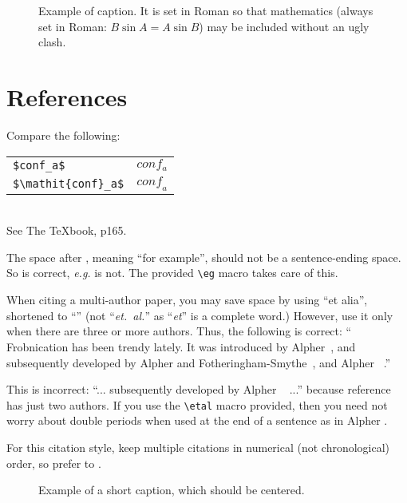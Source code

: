 \documentclass[10pt,twocolumn,letterpaper]{article}
\begin{document}
\begin{figure}[t]
\begin{center}
\fbox{\rule{0pt}{2in} \rule{0.9\linewidth}{0pt}}
\end{center}
   \caption{Example of caption.  It is set in Roman so that mathematics
   (always set in Roman: $B \sin A = A \sin B$) may be included without an
   ugly clash.}
\label{fig:long}
\label{fig:onecol}
\end{figure}

\section{References}

\noindent
Compare the following:\\
\begin{tabular}{ll}
 \verb'$conf_a$' &  $conf_a$ \\
 \verb'$\mathit{conf}_a$' & $\mathit{conf}_a$
\end{tabular}\\
See The \TeX book, p165.

The space after \eg, meaning ``for example'', should not be a
sentence-ending space. So \eg is correct, {\em e.g.} is not.  The provided
\verb'\eg' macro takes care of this.

When citing a multi-author paper, you may save space by using ``et alia'',
shortened to ``\etal'' (not ``{\em et.\ al.}'' as ``{\em et}'' is a complete word.)
However, use it only when there are three or more authors.  Thus, the
following is correct: ``
   Frobnication has been trendy lately.
   It was introduced by Alpher~\cite{Alpher02}, and subsequently developed by
   Alpher and Fotheringham-Smythe~\cite{Alpher03}, and Alpher \etal~\cite{Alpher04}.''

This is incorrect: ``... subsequently developed by Alpher \etal~\cite{Alpher03} ...''
because reference~\cite{Alpher03} has just two authors.  If you use the
\verb'\etal' macro provided, then you need not worry about double periods
when used at the end of a sentence as in Alpher \etal.

For this citation style, keep multiple citations in numerical (not
chronological) order, so prefer \cite{Alpher03,Alpher02,Authors14} to
\cite{Alpher02,Alpher03,Authors14}.


\begin{figure*}
\begin{center}
\fbox{\rule{0pt}{2in} \rule{.9\linewidth}{0pt}}
\end{center}
   \caption{Example of a short caption, which should be centered.}
\label{fig:short}
\end{figure*}
\end{document}
